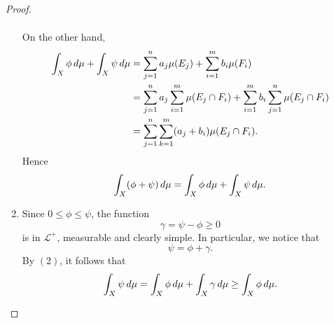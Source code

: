 \documentclass[notoc,notitlepage]{tufte-book}
\begin{document}
\begin{proof}
\begin{enumerate}
\begin{align*}
      \end{align*}
      On the other hand,
      \begin{align*}
        \int_{X} \phi \mathop{}\!d{\mu} + \int_{X} \psi \mathop{}\!d{\mu}
        &= \sum_{j=1}^{n} a_j \mu(E_j) + \sum_{i=1}^{m} b_i \mu(F_i) \\
        &= \sum_{j=1}^{n} a_j \sum_{i=1}^{m} \mu(E_j \cap F_i)
          + \sum_{i=1}^{m} b_i \sum_{j=1}^{n} \mu(E_j \cap F_i) \\
        &= \sum_{j=1}^{n} \sum_{k=1}^{m} (a_j + b_i) \mu(E_j \cap F_i).
      \end{align*}
      Hence
      \begin{equation*}
        \int_{X} (\phi + \psi) \mathop{}\!d{\mu}
          = \int_{X} \phi \mathop{}\!d{\mu} + \int_{X} \psi \mathop{}\!d{\mu}.
      \end{equation*}

    \item Since $0 \leq \phi \leq \psi$, the function
      \begin{equation*}
        \gamma = \psi - \phi \geq 0
      \end{equation*}
      is in $\mathcal{L}^+$, measurable and clearly simple.
      In particular, we notice that
      \begin{equation*}
        \psi = \phi + \gamma.
      \end{equation*}
      By $(2)$, it follows that
      \begin{equation*}
        \int_{X} \psi \mathop{}\!d{\mu}
        = \int_{X} \phi \mathop{}\!d{\mu} + \int_{X} \gamma \mathop{}\!d{\mu}
        \geq \int_{X} \phi \mathop{}\!d{\mu}.
      \end{equation*}


\end{enumerate}
\end{proof}
\end{document}

